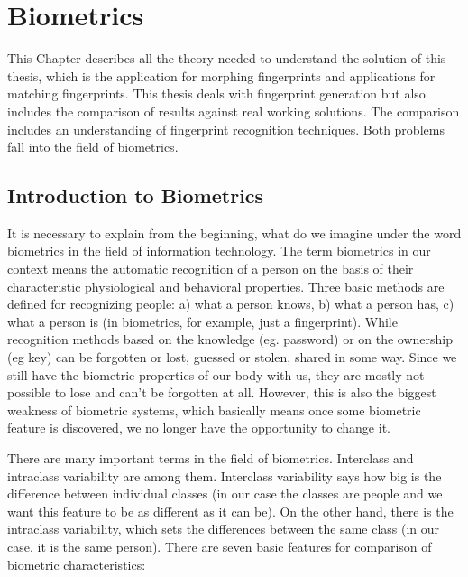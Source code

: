 \chapter{Biometrics} \label{theory}
This Chapter describes all the theory needed to understand the solution of this thesis, which is the application for morphing fingerprints and applications for matching fingerprints. This thesis deals with fingerprint generation but also includes the comparison of results against real working solutions. The comparison includes an understanding of fingerprint recognition techniques. Both problems fall into the field of biometrics.

\section{Introduction to Biometrics}
It is necessary to explain from the beginning, what do we imagine under the word biometrics in the field of information technology. The term biometrics in our context means the automatic recognition of a person on the basis of their characteristic physiological and behavioral properties. Three basic methods are defined for recognizing people: a) what a person knows, b) what a person has, c) what a person is (in biometrics, for example, just a fingerprint). While recognition methods based on the knowledge (eg. password) or on the ownership (eg key) can be forgotten or lost, guessed or stolen, shared in some way. \cite{jain2011introduction} Since we still have the biometric properties of our body with us, they are mostly not possible to lose and can't be forgotten at all. However, this is also the biggest weakness of biometric systems, which basically means once some biometric feature is discovered, we no longer have the opportunity to change it. \cite{maltoni2009handbook}

There are many important terms in the field of biometrics. Interclass and intraclass variability are among them. Interclass variability says how big is the difference between individual classes (in our case the classes are people and we want this feature to be as different as it can be). On the other hand, there is the intraclass variability, which sets the differences between the same class (in our case, it is the same person). There are seven basic features for comparison of biometric characteristics: \cite{maltoni2009handbook}

